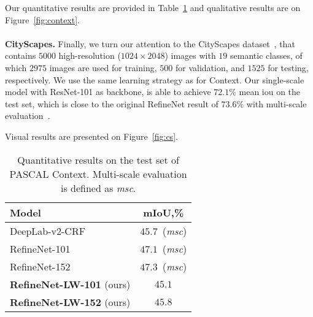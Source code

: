 \documentclass{bmvc2k}
\begin{document}
Our quantitative results are provided in Table~\ref{table:context} and qualitative results are on Figure~\ref{fig:context}.\\
\\
\textbf{CityScapes.}
Finally, we turn our attention to the CityScapes dataset~\cite{CordtsORREBFRS16}, that contains $5000$ high-resolution ($1024\times2048$) images with $19$ semantic classes, of which $2975$ images are used for training, $500$ for validation, and $1525$ for testing, respectively. We use the same learning strategy as for Context. Our single-scale model with ResNet-101 as backbone, is able to achieve $72.1\%$ mean iou on the test set, which is close to the original RefineNet result of $73.6\%$ with multi-scale evaluation~\cite{LinMSR17}.\par
Visual results are presented on Figure~\ref{fig:cs}.
\begin{table}[hbt]
	\vskip -0.1in
	\begin{center}
		\begin{tabular}{l|c}
			\hline Model & mIoU,\% \\
\hline
			DeepLab-v2-CRF~\cite{ChenPK0Y16} & $45.7$~(\emph{msc})\\
			RefineNet-101~\cite{LinMSR17}  & $47.1$~(\emph{msc})\\
			RefineNet-152~\cite{LinMSR17} & $47.3$~(\emph{msc})\\
			\hline
			\textbf{RefineNet-LW-101} (ours) & $45.1$\\
			\textbf{RefineNet-LW-152} (ours)  & $45.8$\\
			\hline
		\end{tabular}
	\end{center}
	\caption{Quantitative results on the test set of PASCAL Context. Multi-scale evaluation is defined as \emph{msc}.\label{table:context}}
	\vskip -0.15in
\end{table} 
\end{document}
